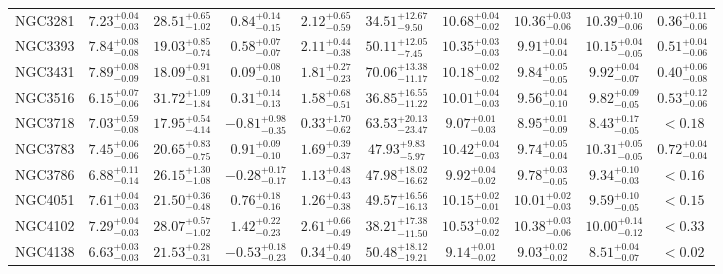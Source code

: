 \documentclass[onecolumn]{mn2e}
\begin{document}
\begin{landscape}
{\begin{center}
\begin{longtable}{lccccccccc}
NGC3281 & $7.23_{-0.03}^{+0.04}$ & $28.51_{-1.02}^{+0.65}$ & $0.84_{-0.15}^{+0.14}$ & $2.12_{-0.59}^{+0.65}$ &$34.51_{-9.50}^{+12.67}$ & $10.68_{-0.02}^{+0.04}$ & $10.36_{-0.06}^{+0.03}$ & $10.39_{-0.06}^{+0.10}$ & $0.36_{-0.06}^{+0.11}$ \\
NGC3393 & $7.84_{-0.08}^{+0.08}$ & $19.03_{-0.74}^{+0.85}$ & $0.58_{-0.07}^{+0.07}$ & $2.11_{-0.38}^{+0.44}$ &$50.11_{-7.45}^{+12.05}$ & $10.35_{-0.03}^{+0.03}$ & $9.91_{-0.04}^{+0.04}$ & $10.15_{-0.05}^{+0.04}$ & $0.51_{-0.06}^{+0.04}$ \\
NGC3431 & $7.89_{-0.09}^{+0.08}$ & $18.09_{-0.81}^{+0.91}$ & $0.09_{-0.10}^{+0.08}$ & $1.81_{-0.23}^{+0.27}$ &$70.06_{-11.17}^{+13.38}$ & $10.18_{-0.02}^{+0.02}$ & $9.84_{-0.05}^{+0.05}$ & $9.92_{-0.07}^{+0.04}$ & $0.40_{-0.08}^{+0.06}$ \\
NGC3516 & $6.15_{-0.06}^{+0.07}$ & $31.72_{-1.84}^{+1.09}$ & $0.31_{-0.13}^{+0.14}$ & $1.58_{-0.51}^{+0.68}$ &$36.85_{-11.22}^{+16.55}$ & $10.01_{-0.03}^{+0.04}$ & $9.56_{-0.10}^{+0.04}$ & $9.82_{-0.05}^{+0.09}$ & $0.53_{-0.06}^{+0.12}$ \\
NGC3718 & $7.03_{-0.08}^{+0.59}$ & $17.95_{-4.14}^{+0.54}$ & $-0.81_{-0.35}^{+0.98}$ & $0.33_{-0.62}^{+1.70}$ &$63.53_{-23.47}^{+20.13}$ & $9.07_{-0.03}^{+0.01}$ & $8.95_{-0.09}^{+0.01}$ & $8.43_{-0.05}^{+0.17}$ & $<0.18$ \\
NGC3783 & $7.45_{-0.06}^{+0.06}$ & $20.65_{-0.75}^{+0.83}$ & $0.91_{-0.10}^{+0.09}$ & $1.69_{-0.37}^{+0.39}$ &$47.93_{-5.97}^{+9.83}$ & $10.42_{-0.03}^{+0.04}$ & $9.74_{-0.04}^{+0.05}$ & $10.31_{-0.05}^{+0.05}$ & $0.72_{-0.04}^{+0.04}$ \\
NGC3786 & $6.88_{-0.14}^{+0.11}$ & $26.15_{-1.08}^{+1.30}$ & $-0.28_{-0.17}^{+0.17}$ & $1.13_{-0.43}^{+0.48}$ &$47.98_{-16.62}^{+18.02}$ & $9.92_{-0.02}^{+0.04}$ & $9.78_{-0.05}^{+0.03}$ & $9.34_{-0.03}^{+0.10}$ & $<0.16$ \\
NGC4051 & $7.61_{-0.03}^{+0.04}$ & $21.50_{-0.48}^{+0.36}$ & $0.76_{-0.16}^{+0.18}$ & $1.26_{-0.38}^{+0.43}$ &$49.57_{-16.13}^{+16.56}$ & $10.15_{-0.01}^{+0.02}$ & $10.01_{-0.03}^{+0.02}$ & $9.59_{-0.05}^{+0.10}$ & $<0.15$ \\
NGC4102 & $7.29_{-0.03}^{+0.04}$ & $28.07_{-1.02}^{+0.57}$ & $1.42_{-0.23}^{+0.22}$ & $2.61_{-0.49}^{+0.66}$ &$38.21_{-11.50}^{+17.38}$ & $10.53_{-0.02}^{+0.02}$ & $10.38_{-0.06}^{+0.03}$ & $10.00_{-0.12}^{+0.14}$ & $<0.33$ \\
NGC4138 & $6.63_{-0.03}^{+0.03}$ & $21.53_{-0.31}^{+0.28}$ & $-0.53_{-0.23}^{+0.18}$ & $0.34_{-0.40}^{+0.49}$ &$50.48_{-19.21}^{+18.12}$ & $9.14_{-0.02}^{+0.01}$ & $9.03_{-0.02}^{+0.02}$ & $8.51_{-0.07}^{+0.04}$ & $<0.02$ \\

\end{longtable}
\end{center}}
\end{landscape}
\end{document}
